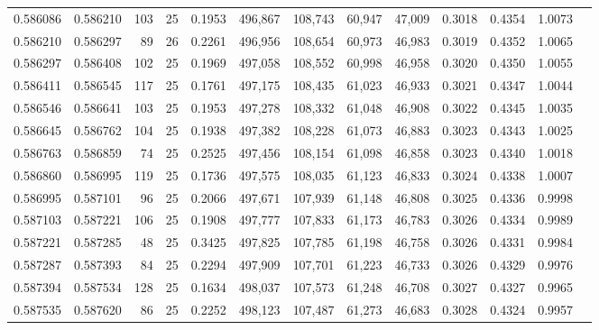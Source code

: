 \begin{tabular}{rrrrrrrrrrrrr}
0.586086 & 0.586210 &   103 &  25 &                                     0.1953 & 496,867 & 108,743 &  60,947 &  47,009 & 0.3018 & 0.4354 & 1.0073 \\
0.586210 & 0.586297 &    89 &  26 &                                     0.2261 & 496,956 & 108,654 &  60,973 &  46,983 & 0.3019 & 0.4352 & 1.0065 \\
0.586297 & 0.586408 &   102 &  25 &                                     0.1969 & 497,058 & 108,552 &  60,998 &  46,958 & 0.3020 & 0.4350 & 1.0055 \\
0.586411 & 0.586545 &   117 &  25 &                                     0.1761 & 497,175 & 108,435 &  61,023 &  46,933 & 0.3021 & 0.4347 & 1.0044 \\
0.586546 & 0.586641 &   103 &  25 &                                     0.1953 & 497,278 & 108,332 &  61,048 &  46,908 & 0.3022 & 0.4345 & 1.0035 \\
0.586645 & 0.586762 &   104 &  25 &                                     0.1938 & 497,382 & 108,228 &  61,073 &  46,883 & 0.3023 & 0.4343 & 1.0025 \\
0.586763 & 0.586859 &    74 &  25 &                                     0.2525 & 497,456 & 108,154 &  61,098 &  46,858 & 0.3023 & 0.4340 & 1.0018 \\
0.586860 & 0.586995 &   119 &  25 &                                     0.1736 & 497,575 & 108,035 &  61,123 &  46,833 & 0.3024 & 0.4338 & 1.0007 \\
0.586995 & 0.587101 &    96 &  25 &                                     0.2066 & 497,671 & 107,939 &  61,148 &  46,808 & 0.3025 & 0.4336 & 0.9998 \\
0.587103 & 0.587221 &   106 &  25 &                                     0.1908 & 497,777 & 107,833 &  61,173 &  46,783 & 0.3026 & 0.4334 & 0.9989 \\
0.587221 & 0.587285 &    48 &  25 &                                     0.3425 & 497,825 & 107,785 &  61,198 &  46,758 & 0.3026 & 0.4331 & 0.9984 \\
0.587287 & 0.587393 &    84 &  25 &                                     0.2294 & 497,909 & 107,701 &  61,223 &  46,733 & 0.3026 & 0.4329 & 0.9976 \\
0.587394 & 0.587534 &   128 &  25 &                                     0.1634 & 498,037 & 107,573 &  61,248 &  46,708 & 0.3027 & 0.4327 & 0.9965 \\
0.587535 & 0.587620 &    86 &  25 &                                     0.2252 & 498,123 & 107,487 &  61,273 &  46,683 & 0.3028 & 0.4324 & 0.9957 \\

\end{tabular}
